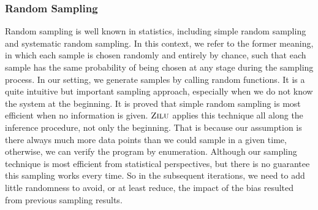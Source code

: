 
\subsubsection{Random Sampling}
Random sampling is well known in statistics, including simple random sampling and systematic random sampling.
In this context, we refer to the former meaning, in which each sample is chosen randomly and entirely by chance, 
such that each sample has the same probability of being chosen at any stage during the sampling process.
In our setting, we generate samples by calling random functions.
It is a quite intuitive but important sampling approach, especially when we do not know the system at the beginning. 
It is proved that simple random sampling is most efficient when no information is given.
$\textsc{Zilu}$ applies this technique all along the inference procedure, not only the beginning. 
That is because our assumption is there always much more data points than we could sample in a given time,
otherwise, we can verify the program by enumeration.
Although our sampling technique is most efficient from statistical perspectives, 
but there is no guarantee this sampling works every time.
So in the subsequent iterations, we need to add little randomness to avoid, or at least reduce, 
the impact of the bias resulted from previous sampling results.


